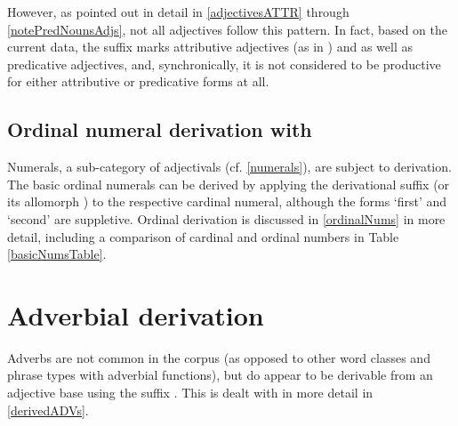 However, as pointed out in detail in \SEC\ref{adjectivesATTR} through \SEC\ref{notePredNounsAdjs}, not all adjectives follow this pattern. In fact, based on the current data, the  suffix marks attributive adjectives (as in ) and as well as predicative adjectives, %
and, synchronically, it is not considered to be productive for either attributive or predicative forms at all. 



\subsection{Ordinal numeral derivation with }\label{ordNUMderiv}
Numerals, a sub-category of adjectivals (cf. \SEC\ref{numerals}), are subject to derivation. 
The basic ordinal numerals can be derived by applying the derivational suffix  (or its allomorph ) %
to the respective cardinal numeral, although the forms  ‘first’ and  ‘second’ are suppletive. Ordinal derivation is discussed in \SEC\ref{ordinalNums} in more detail, including a comparison of cardinal and ordinal numbers in Table \vref{basicNumsTable}. 




\section{Adverbial derivation}\label{advDerivation}
Adverbs are not common in the corpus (as opposed to other word classes and phrase types with adverbial functions), but do appear to be derivable from an adjective base using the suffix . This is dealt with in more detail in \SEC\ref{derivedADVs}. 






